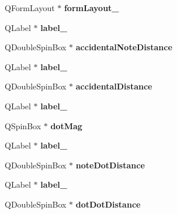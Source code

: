 \begin{DoxyCompactItemize}
Q\+Form\+Layout $\ast$ {\bfseries form\+Layout\+\_}
\item 
\mbox{\label{class_ui___edit_style_base_a312ee453608f850db17c81e7d17cd069}} 
Q\+Label $\ast$ {\bfseries label\+\_}
\item 
\mbox{\label{class_ui___edit_style_base_ae2582dc9fc2caff28904bc77addce18a}} 
Q\+Double\+Spin\+Box $\ast$ {\bfseries accidental\+Note\+Distance}
\item 
\mbox{\label{class_ui___edit_style_base_a4d815ec4f28576426f4f758a22ef84de}} 
Q\+Label $\ast$ {\bfseries label\+\_}
\item 
\mbox{\label{class_ui___edit_style_base_a29c99ded672f9c160ad8b346c5c8efed}} 
Q\+Double\+Spin\+Box $\ast$ {\bfseries accidental\+Distance}
\item 
\mbox{\label{class_ui___edit_style_base_a8c89eb277f60667a10acf2cedee06199}} 
Q\+Label $\ast$ {\bfseries label\+\_}
\item 
\mbox{\label{class_ui___edit_style_base_a194bd209612f7869c7f3239f8617af58}} 
Q\+Spin\+Box $\ast$ {\bfseries dot\+Mag}
\item 
\mbox{\label{class_ui___edit_style_base_a7b5f99946cb5a1535786be3dbc66007c}} 
Q\+Label $\ast$ {\bfseries label\+\_}
\item 
\mbox{\label{class_ui___edit_style_base_a99bac9a31e274c2839420d5d4e55eea2}} 
Q\+Double\+Spin\+Box $\ast$ {\bfseries note\+Dot\+Distance}
\item 
\mbox{\label{class_ui___edit_style_base_a72160166995a78e8f53cd22e8518a551}} 
Q\+Label $\ast$ {\bfseries label\+\_}
\item 
\mbox{\label{class_ui___edit_style_base_af49d29d5a8ebf6eeecdc94aead7beee5}} 
Q\+Double\+Spin\+Box $\ast$ {\bfseries dot\+Dot\+Distance}
\item 
\mbox{\label{class_ui___edit_style_base_a030724c60c53e5081a0211fa3eb96630}} 

\end{DoxyCompactItemize}
